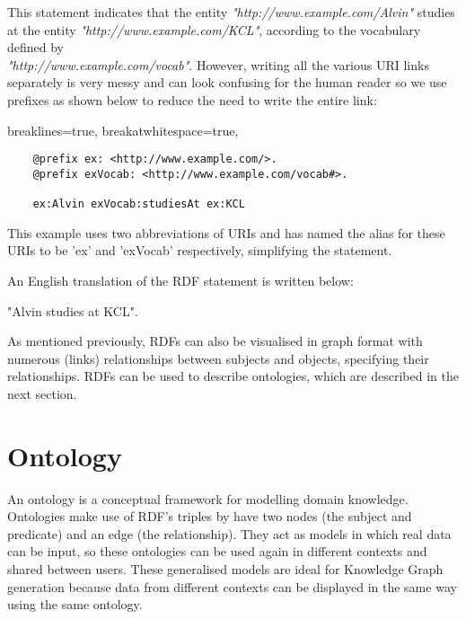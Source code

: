 This statement indicates that the entity \textit{"http://www.example.com/Alvin"} studies at the entity \textit{"http://www.example.com/KCL"}, according to the vocabulary defined by \\\textit{"http://www.example.com/vocab"}. However, writing all the various URI links separately is very messy and can look confusing for the human reader so we use prefixes as shown below to reduce the need to write the entire link:

\lstset
{
    breaklines=true,
    breakatwhitespace=true,
}
\begin{center}
\begin{lstlisting}
    @prefix ex: <http://www.example.com/>. 
    @prefix exVocab: <http://www.example.com/vocab#>. 

    ex:Alvin exVocab:studiesAt ex:KCL
\end{lstlisting}
\end{center} 

This example uses two abbreviations of URIs and has named the alias for these URIs to be 'ex' and 'exVocab' respectively, simplifying the statement. 

An English translation of the RDF statement is written below: 

\begin{center}
    "Alvin studies at KCL". 
\end{center}

As mentioned previously, RDFs can also be visualised in graph format with numerous (links) relationships between subjects and objects, specifying their relationships. RDFs can be used to describe ontologies, which are described in the next section.

\section{Ontology}
\hspace{0.5cm} An ontology is a conceptual framework for modelling domain knowledge. \cite{ontology} Ontologies make use of RDF's triples by have two nodes (the subject and predicate) and an edge (the relationship). They act as models in which real data can be input, so these ontologies can be used again in different contexts and shared between users. These generalised models are ideal for Knowledge Graph generation because data from different contexts can be displayed in the same way using the same ontology. 

